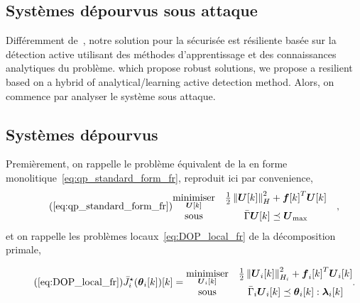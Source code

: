 \documentclass[../main.tex]{subfiles}
\begin{document}
\subsection{Systèmes dépourvus sous attaque}\label{sec:syst-depo-sous}

Différemment de~\cite{VelardeEtAl2018,MaestreEtAl2021}, notre solution pour la \dmpc{} sécurisée est résiliente basée sur la détection active utilisant des méthodes d'apprentissage et des connaissances analytiques du problème.  which propose robust solutions, we propose a resilient \dmpc{} based on a hybrid of analytical/learning active detection method.
Alors, on commence par analyser le système sous attaque.

\subsection{Systèmes dépourvus}\label{sec:deprived-systems_fr}
Premièrement, on rappelle le problème équivalent de la \mpc{} en forme monolitique~\eqref{eq:qp_standard_form_fr}, reproduit ici par convenience,
\begin{equation}
  \label{eq:qp_standard_form_again_fr}
  \tag{\ref*{eq:qp_standard_form_fr}}
  \begin{aligned}
    \begin{matrix}
      \minimiser\limits_{\vec{U}[k]} &
                                                 \frac{1}{2}\norm{\vec{U}[k]}^{2}_{H} + {\vec{f}[k]}^{T}\vec{U}[k] &\\
      \mathrm{sous} &
                             \bar{\Gamma}\vec{U}[k]\preceq {\vec{U}}_{\text{max}}
    \end{matrix}
  \end{aligned},
\end{equation}
et on rappelle les problèmes locaux~\eqref{eq:DOP_local_fr} de la décomposition primale,

\begin{equation}
  \label{eq:DOP_local_reprise_fr}
  \tag{\ref*{eq:DOP_local_fr}}
  \eqoptobji(\thetaik)[k]=
  \begin{matrix}
    \minimiser\limits_{\vec{U}_{i}[k]}&\frac{1}{2}\norm{\vec{U}_{i}[k]}^{2}_{H_{i}} + {\vec{f}_{i}[k]}^{T}\vec{U}_{i}[k]\\
    \mathrm{sous} & \bar{\Gamma}_{i}\vec{U}_{i}[k] \preceq \thetaik:\lambdaik
  \end{matrix}.
\end{equation}
\end{document}
